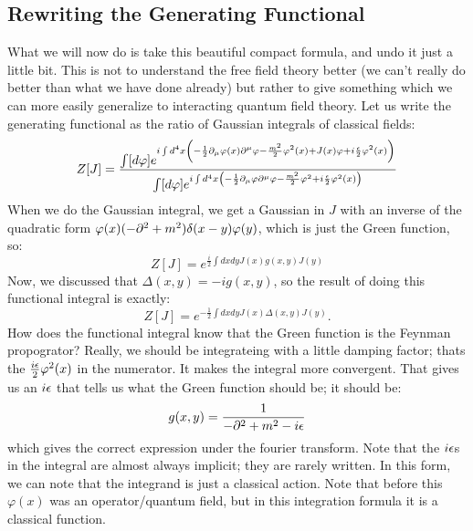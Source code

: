 \subsection{Rewriting the Generating Functional}
What we will now do is take this beautiful compact formula, and undo it just a little bit. This is not to understand the free field theory better (we can't really do better than what we have done already) but rather to give something which we can more easily generalize to interacting quantum field theory. Let us write the generating functional as the ratio of Gaussian integrals of classical fields:
\begin{equation}
    Z[J] = \frac{\int [d\varphi] e^{i\int d^4x \left(-\frac{1}{2}\p_\mu \varphi(x) \p^\mu \varphi - \frac{m^2}{2}\varphi^2(x) + J(x)\varphi + i\frac{\e}{2}\varphi^2(x)\right)}}{\int [d\varphi] e^{i\int d^4x\left(-\frac{1}{2}\p_\mu \varphi \p^\mu \varphi - \frac{m^2}{2}\varphi^2 + i\frac{\e}{2}\varphi^2(x)\right)}}
\end{equation}
When we do the Gaussian integral, we get a Gaussian in $J$ with an inverse of the quadratic form $\varphi(x)(-\p^2 + m^2)\delta(x - y)\varphi(y)$, which is just the Green function, so:
\begin{equation}
    Z[J] = e^{\frac{i}{2}\int dxdy J(x)g(x, y)J(y)}
\end{equation}
Now, we discussed that $\Delta(x, y) = -ig(x, y)$, so the result of doing this functional integral is exactly:
\begin{equation}
    Z[J] = e^{-\frac{1}{2}\int dxdy J(x)\Delta(x, y)J(y)}.
\end{equation}
How does the functional integral know that the Green function is the Feynman propogrator? Really, we should be integrateing with a little damping factor; thats the $\frac{i\e}{2}\varphi^2(x)$ in the numerator. It makes the integral more convergent. That gives us an $i\epsilon$ that tells us what the Green function should be; it should be:
\begin{equation}
    g(x, y) = \frac{1}{-\partial^2 + m^2 - i\epsilon}
\end{equation}
which gives the correct expression under the fourier transform. Note that the $i\epsilon$s in the integral are almost always implicit; they are rarely written. In this form, we can note that the integrand is just a classical action. Note that before this $\varphi(x)$ was an operator/quantum field, but in this integration formula it is a classical function. 


